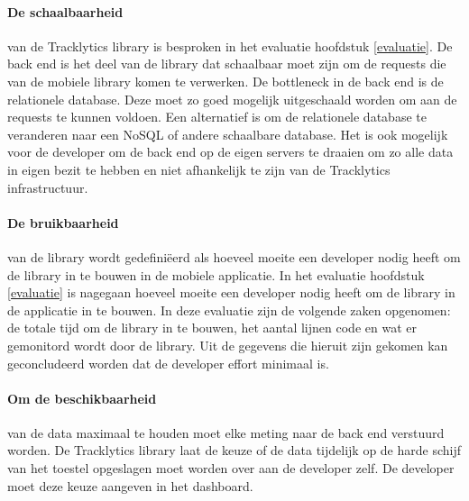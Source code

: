 \paragraph{De schaalbaarheid} van de Tracklytics library is besproken in het evaluatie hoofdstuk \ref{evaluatie}. De back end is het deel van de library dat schaalbaar moet zijn om de requests die van de mobiele library komen te verwerken. De bottleneck in de back end is de relationele database. Deze moet zo goed mogelijk uitgeschaald worden om aan de requests te kunnen voldoen. Een alternatief is om de relationele database te veranderen naar een NoSQL of andere schaalbare database. Het is ook mogelijk voor de developer om de back end op de eigen servers te draaien om zo alle data in eigen bezit te hebben en niet afhankelijk te zijn van de Tracklytics infrastructuur.\\


\paragraph{De bruikbaarheid} van de library wordt gedefini\"eerd als hoeveel moeite een developer nodig heeft om de library in te bouwen in de mobiele applicatie. In het evaluatie hoofdstuk \ref{evaluatie} is nagegaan hoeveel moeite een developer nodig heeft om de library in de applicatie in te bouwen. In deze evaluatie zijn de volgende zaken opgenomen: de totale tijd om de library in te bouwen, het aantal lijnen code en wat er gemonitord wordt door de library. Uit de gegevens die hieruit zijn gekomen kan geconcludeerd worden dat de developer effort minimaal is.

\paragraph{Om de beschikbaarheid} van de data maximaal te houden moet elke meting naar de back end verstuurd worden. De Tracklytics library laat de keuze of de data tijdelijk op de harde schijf van het toestel opgeslagen moet worden over aan de developer zelf. De developer moet deze keuze aangeven in het dashboard. \\

